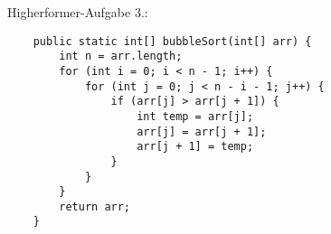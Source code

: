 \documentclass{../../sheet}
\begin{document}
\newpage
\hypertarget{Highperformer}{}
Higherformer-Aufgabe 3.:
\begin{verbatim}
    public static int[] bubbleSort(int[] arr) {
        int n = arr.length;
        for (int i = 0; i < n - 1; i++) {
            for (int j = 0; j < n - i - 1; j++) {
                if (arr[j] > arr[j + 1]) {
                    int temp = arr[j];
                    arr[j] = arr[j + 1];
                    arr[j + 1] = temp;
                }
            }
        }
        return arr;
    }
    \end{verbatim}
\end{document}

